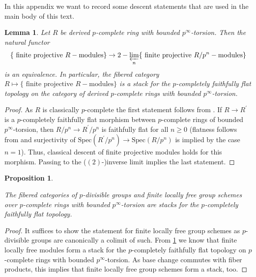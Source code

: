 \documentclass{amsart}
\theoremstyle{plain}
\newtheorem{proposition}[theorem]{Proposition}
\newtheorem{lemma}[theorem]{Lemma}
\theoremstyle{definition}
\newcommand{\Spec}{\mathrm{Spec}}
\newcommand{\green}[1]{{\color{black}#1}}
\begin{document}
\green{
In this appendix we want to record some descent statements that are used in the main body of this text.

\begin{lemma}
  \label{sec:descent-p-completely-1-description-of-finite-projective-modules-on-p-complete-rings}
  Let $R$ be derived $p$-complete ring with bounded $p^\infty$-torsion. Then the natural functor
  $$
    \{\text{ finite projective }R-\text{modules}\}\to 2-\varprojlim\limits_n \{\text{ finite projective }R/p^n-\text{modules}\}
    $$
    is an equivalence.
    In particular, the fibered category $R\mapsto \{\text{ finite projective }R-\text{modules}\}$ is a stack for the $p$-completely faithfully flat topology on the category of derived $p$-complete rings with bounded $p^\infty$-torsion.
\end{lemma}
\begin{proof}
  As $R$ is classically $p$-complete the first statement follows from \cite[Tag 0D4B]{stacks_project}. If $R\to R^\prime$ is a $p$-completely faithfully flat morphism between $p$-complete rings of bounded $p^\infty$-torsion, then $R/p^n\to R^\prime/p^n$ is faithfully flat for all $n\geq 0$ (flatness follows from \cite[Lemma 4.7.(2)]{bhatt_morrow_scholze_topological_hochschild_homology} and surjectivity of $\Spec(R^\prime/p^n)\to \Spec(R/p^n)$ is implied by the case $n=1$). Thus, classical descent of finite projective modules holds for this morphism. Passing to the ($(2)$-)inverse limit implies the last statement. 
\end{proof}
}
\begin{proposition}
  \label{sec:fully-faithf-prism-proposition-bt-is-a-stack}

  The fibered categories of $p$-divisible groups and finite locally free group schemes over $p$-complete rings with bounded $p^\infty$-torsion are stacks for the $p$-completely faithfully flat topology. 
\end{proposition}
\begin{proof}
  It suffices to show the statement for finite locally free group schemes as $p$-divisible groups are canonically a colimit of such.
 From \ref{sec:descent-p-completely-1-description-of-finite-projective-modules-on-p-complete-rings} we know that finite locally free modules form a stack for the $p$-completely faithfully flat topology on $p$-complete rings with bounded $p^\infty$-torsion. As base change commutes with fiber products, this implies that finite locally free group schemes form a stack, too.
\end{proof}
	
\end{document}
